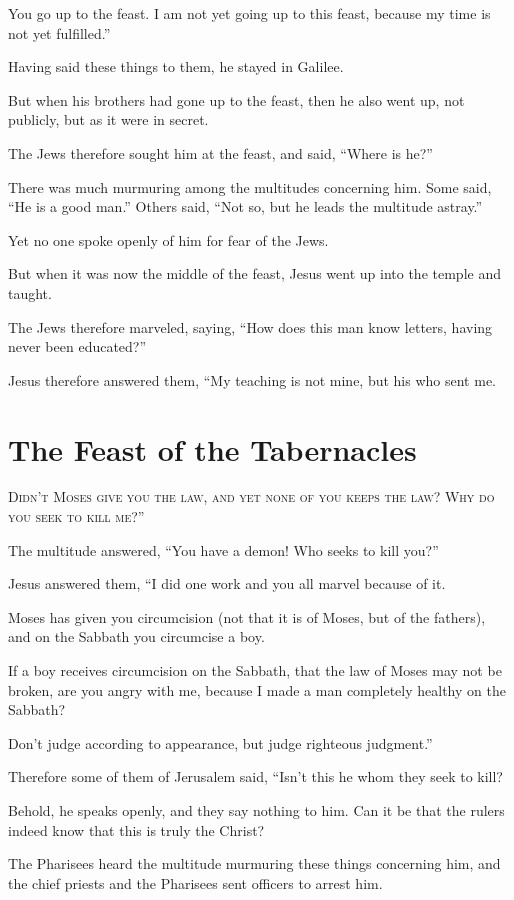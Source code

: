 You go up to the feast. I am not yet going up to this feast, because my time is not yet fulfilled.”

Having said these things to them, he stayed in Galilee.

But when his brothers had gone up to the feast, then he also went up, not publicly, but as it were in secret.

The Jews therefore sought him at the feast, and said, “Where is he?”

There was much murmuring among the multitudes concerning him. Some said, “He is a good man.” Others said, “Not so, but he leads the multitude astray.”

Yet no one spoke openly of him for fear of the Jews.

But when it was now the middle of the feast, Jesus went up into the temple and taught.

The Jews therefore marveled, saying, “How does this man know letters, having never been educated?”

Jesus therefore answered them, “My teaching is not mine, but his who sent me.


\clearpage \section*{The Feast of the Tabernacles}

\lettrine{D}{idn’t Moses give you the law, and yet none of you keeps the law? Why do you seek to kill me?”}

The multitude answered, “You have a demon! Who seeks to kill you?”

Jesus answered them, “I did one work and you all marvel because of it.

Moses has given you circumcision (not that it is of Moses, but of the fathers), and on the Sabbath you circumcise a boy.

If a boy receives circumcision on the Sabbath, that the law of Moses may not be broken, are you angry with me, because I made a man completely healthy on the Sabbath?

Don’t judge according to appearance, but judge righteous judgment.”

Therefore some of them of Jerusalem said, “Isn’t this he whom they seek to kill?

Behold, he speaks openly, and they say nothing to him. Can it be that the rulers indeed know that this is truly the Christ?

The Pharisees heard the multitude murmuring these things concerning him, and the chief priests and the Pharisees sent officers to arrest him.

